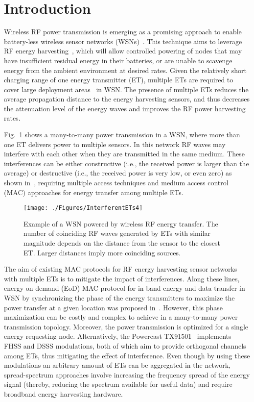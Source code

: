 \documentclass[conference]{IEEEtran}
\begin{document}
 
\section{Introduction}
Wireless RF power transmission is emerging as a promising approach to enable battery-less wireless sensor networks (WSNs)~\cite{zane-proceedings,naderi-RFMAC}. This technique aims to leverage RF energy harvesting~\cite{survey-sources}, which will allow controlled powering of nodes that may have insufficient residual energy in their batteries, or are unable to scavenge energy from the ambient environment at desired rates.
Given the relatively short charging range of one energy transmitter (ET), multiple ETs are required to cover large deployment areas~\cite{naderi-RFMAC} in WSN. The presence of multiple ETs reduces the average propagation distance to the energy harvesting sensors, and thus decreases the attenuation level of the energy waves and improves the RF power harvesting rates.  

Fig.~\ref{fig:interferers} shows a many-to-many power transmission in a WSN, where more than one ET delivers power to multiple sensors. In this network RF waves may interfere with each other when they are transmitted in the same medium. These interferences can be either constructive (i.e., the received power is larger than the average) or destructive (i.e., the received power is very low, or even zero) as shown in~\cite{naderi-RFMAC}, requiring multiple access techniques and medium access control (MAC) approaches for energy transfer among multiple ETs. 

\begin{figure}
  \centering
    \texttt{[image: ./Figures/InterferentETs4]}
 \caption{Example of a WSN powered by wireless RF energy transfer. The number of coinciding RF waves generated by ETs with similar magnitude depends on the distance from the sensor to the closest ET. Larger distances imply more coinciding sources.}
 \label{fig:interferers}
 \vspace{0.0 cm}
\end{figure}


The aim of existing MAC protocols for RF energy harvesting sensor networks with multiple ETs is to mitigate the impact of interferences. Along these lines, energy-on-demand (EoD) MAC protocol for in-band energy and data transfer in WSN by synchronizing the phase of the energy transmitters to maximize the power transfer at a given location was proposed in~\cite{naderi-RFMAC}. However, this phase maximization can be costly and complex to achieve in a many-to-many power transmission topology. Moreover, the power transmission is optimized for a single energy requesting node. Alternatively, the Powercast TX91501~\cite{powercast} implements FHSS and DSSS modulations, both of which aim to provide orthogonal channels among ETs, thus mitigating the effect of interference. 
Even though by using these modulations an arbitrary amount of ETs can be aggregated in the network, spread-spectrum approaches involve increasing the frequency spread of the energy signal (thereby, reducing the spectrum available for useful data) and require broadband energy harvesting hardware.
\end{document}
